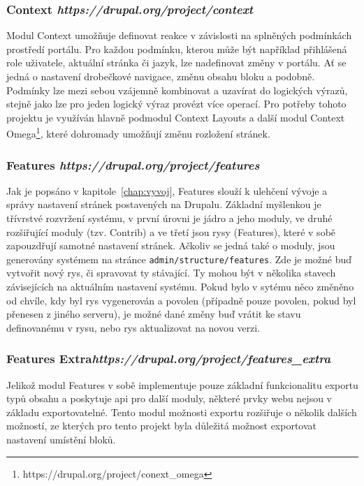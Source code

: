 \subsubsection*{Context \hfill \emph{https://drupal.org/project/context}} 
\label{subsec:context}
Modul Context umožňuje definovat reakce v závislosti na splněných podmínkách prostředí portálu. Pro každou podmínku, kterou může být například přihlášená role uživatele, aktuální stránka či jazyk, lze nadefinovat změny v portálu. Ať se jedná o nastavení drobečkové navigace, změnu obsahu bloku a podobně. Podmínky lze mezi sebou vzájemně kombinovat a uzavírat do logických výrazů, stejně jako lze pro jeden logický výraz provézt více operací. Pro potřeby tohoto projektu je využíván hlavně podmodul Context Layouts a další modul Context Omega\footnote{https://drupal.org/project/conext\_omega}, které dohromady umožňují změnu rozložení stránek.

\subsubsection*{Features \hfill \emph{https://drupal.org/project/features}} 
\label{subsec:features}
Jak je popsáno v kapitole~\ref{chap:vyvoj}, Features slouží k ulehčení vývoje a správy nastavení stránek postavených na Drupalu. Základní myšlenkou je třívrstvé rozvržení systému, v první úrovni je jádro a jeho moduly, ve druhé rozšiřující moduly (tzv. Contrib) a ve třetí jsou rysy (Features), které v sobě zapouzdřují samotné nastavení stránek. Ačkoliv se jedná také o moduly, jsou generovány systémem na stránce \texttt{admin/structure/features}. Zde je možné buď vytvořit nový rys, či spravovat ty stávající. Ty mohou být v několika stavech závisejících na aktuálním nastavení systému. Pokud bylo v sytému něco změněno od chvíle, kdy byl rys vygenerován a povolen (případně pouze povolen, pokud byl přenesen z jiného serveru), je možné dané změny buď vrátit ke stavu definovanému v rysu, nebo rys aktualizovat na novou verzi.

\subsubsection*{Features Extra\hfill \emph{https://drupal.org/project/features\_extra}} 
Jelikož modul Features v sobě implementuje pouze základní funkcionalitu exportu typů obsahu a poskytuje \gls{api} pro další moduly, některé prvky webu nejsou v základu exportovatelné. Tento modul možnosti exportu rozšiřuje o několik dalších možností, ze kterých pro tento projekt byla důležitá možnost exportovat nastavení umístění bloků.

